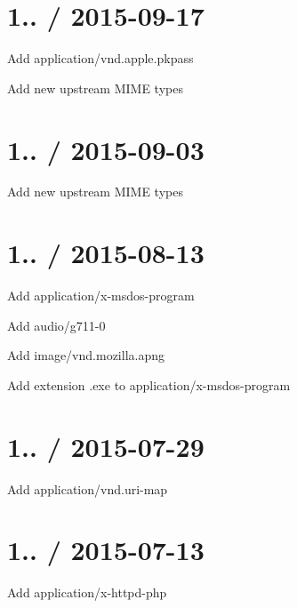 \section*{1.. / 2015-\/09-\/17 }


\begin{DoxyItemize}
\item Add {\ttfamily application/vnd.\+apple.\+pkpass}
\item Add new upstream M\+I\+ME types
\end{DoxyItemize}

\section*{1.. / 2015-\/09-\/03 }


\begin{DoxyItemize}
\item Add new upstream M\+I\+ME types
\end{DoxyItemize}

\section*{1.. / 2015-\/08-\/13 }


\begin{DoxyItemize}
\item Add {\ttfamily application/x-\/msdos-\/program}
\item Add {\ttfamily audio/g711-\/0}
\item Add {\ttfamily image/vnd.\+mozilla.\+apng}
\item Add extension {\ttfamily .exe} to {\ttfamily application/x-\/msdos-\/program}
\end{DoxyItemize}

\section*{1.. / 2015-\/07-\/29 }


\begin{DoxyItemize}
\item Add {\ttfamily application/vnd.\+uri-\/map}
\end{DoxyItemize}

\section*{1.. / 2015-\/07-\/13 }


\begin{DoxyItemize}
\item Add {\ttfamily application/x-\/httpd-\/php}
\end{DoxyItemize}

